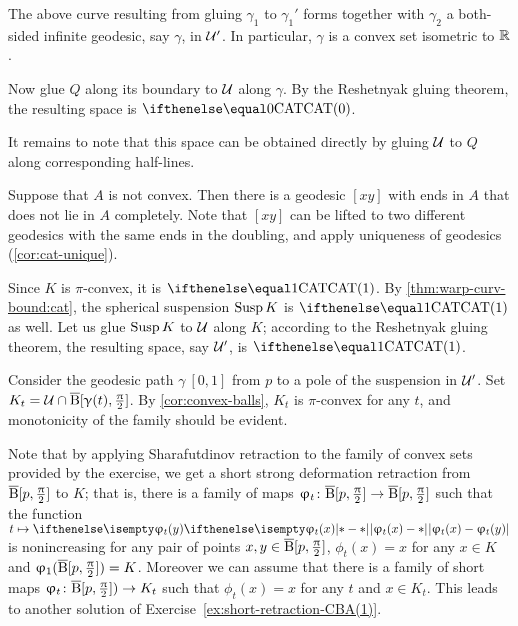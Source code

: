 The above curve resulting from gluing  
$\gamma_1$ to $\gamma_1'$ 
forms together with $ \gamma_2$ 
a both-sided infinite geodesic, say $\gamma$, in $\mathcal{U}'$.
In particular, $\gamma$ is a convex set isometric to $\mathbb{R}$.

Now glue 
$Q$ along its boundary to $\mathcal{U}$ along $\gamma$.
By the Reshetnyak gluing theorem, the resulting space is $\CAT0$.

It remains to note that this space can be obtained directly by gluing $\mathcal{U}$ to $Q$ along 
corresponding half-lines.

Suppose that $A$ is not convex.
Then there is a geodesic $[xy]$ with ends in $A$ that does not lie in $A$ completely.
Note that $[xy]$ can be lifted to two different geodesics with the same ends  in the doubling, and apply uniqueness of geodesics (\ref{cor:cat-unique}).

Since $K$ is $\pi$-convex, it is $\CAT1$.
By \ref{thm:warp-curv-bound:cat}, the spherical suspension $\mathop{\rm Susp}\nolimits K$ is $\CAT1$ as well.
Let us glue $\mathop{\rm Susp}\nolimits K$ to $\mathcal{U}$  along $K$;
according to the Reshetnyak gluing theorem, the resulting space, say $\mathcal{U}'$, is $\CAT1$.

Consider the geodesic path $\gamma\:[0,1]$ from $p$ to a pole of the suspension in $\mathcal{U}'$.
Set $K_t=\spc{U}\cap\cBall[\gamma(t),\tfrac\pi2]$.
By \ref{cor:convex-balls}, $K_t$ is $\pi$-convex for any $t$,  and monotonicity of the family should be evident.

Note that by applying Sharafutdinov retraction to the family of convex sets provided by the exercise,
we get a short strong deformation retraction from $\overline{\mathrm{B}}{}[p,\tfrac{\uppi}2]$ to $K$;
that is, there is a family of maps $\phi_t\:\cBall[p,\tfrac\pi2]\to \cBall[p,\tfrac\pi2]$ such that 
the function $t\mapsto \dist{\phi_t(x)}{\phi_t(y)}{}$ is nonincreasing for any pair of points $x,y\in\cBall[p,\tfrac\pi2]$, $\phi_t(x)=x$ for any $x\in K$ and $\upvarphi_1(\overline{\mathrm{B}}{}[p,\tfrac{\uppi}2])=K$. 
Moreover we can assume that there is a family of short maps 
$\phi_t\:\cBall[p,\tfrac\pi2])\to  K_t$ such that $\phi_t(x)=x$ for any $t$ and $x\in K_t$.
This leads to another solution of Exercise~\ref{ex:short-retraction-CBA(1)}.




